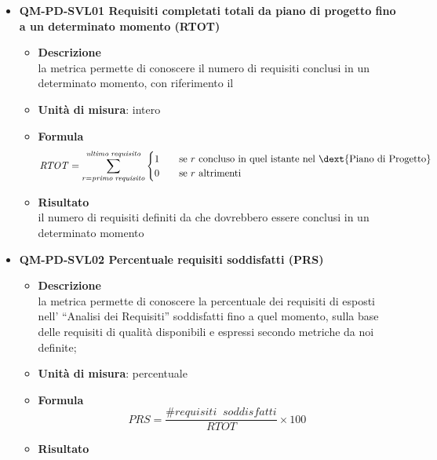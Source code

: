 				\begin{itemize}
					\item\textbf{QM-PD-SVL01 Requisiti completati totali da piano di progetto fino a un determinato momento (RTOT)}
						\begin{itemize}
							\item\textbf{Descrizione}\\
								la metrica permette di conoscere il numero di requisiti conclusi in un determinato momento, con riferimento il \\
							\item\textbf{Unità di misura}: intero
							\item\textbf{Formula}\\
								$$ \mathit{RTOT} = \sum_{r = \mathit{primo\;requisito}}^{\mathit{ultimo\;requisito}}
  									\begin{cases}
    										1       & \quad \text{se } r \text{ concluso in quel istante nel \dext{Piano di Progetto}}\\
    										0  & \quad \text{se } r \text{ altrimenti}
 								 	\end{cases}
								$$
							\item\textbf{Risultato}\\
								il numero di requisiti definiti da  che dovrebbero essere conclusi in un determinato momento
								\newline
								\newline
								\newline
						\end{itemize}
					\item\textbf{QM-PD-SVL02 Percentuale requisiti soddisfatti (PRS)}
						\begin{itemize}
							\item\textbf{Descrizione}\\
								la metrica permette di conoscere la percentuale dei requisiti di esposti nell’ “Analisi dei Requisiti” soddisfatti fino a quel momento, sulla base delle requisiti di qualità disponibili e espressi secondo metriche da noi definite;\\
							\item\textbf{Unità di misura}: percentuale
							\item\textbf{Formula}\\
								\[PRS = \frac{\mathit{\#requisiti\;\;soddisfatti}}{\mathit{RTOT}} \times 100 \]
							\item\textbf{Risultato}\\

\end{itemize}
\end{itemize}
